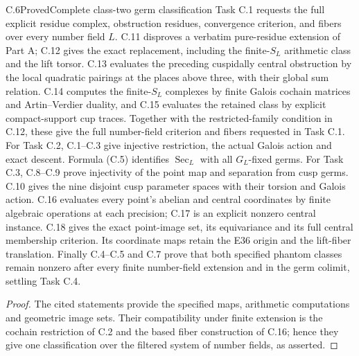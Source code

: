\begin{statement}{C.6}{Proved}{Complete class-two germ classification}
Task C.1 requests the full explicit residue complex,
obstruction residues, convergence criterion, and fibers
over every number field $L$.  C.11 disproves a
verbatim pure-residue extension of Part A; C.12
gives the exact replacement, including the
finite-$S_L$ arithmetic class and the lift torsor.
C.13 evaluates the preceding cuspidally central
obstruction by the local quadratic pairings at the
places above three, with their global sum relation.
C.14 computes the finite-$S_L$ complexes by finite Galois
cochain matrices and Artin--Verdier duality, and C.15
evaluates the retained class by explicit compact-support
cup traces.  Together with the restricted-family condition
in C.12, these give the full number-field criterion and
fibers requested in Task C.1.
For Task C.2, C.1--C.3 give injective restriction,
the actual Galois action and exact descent.  Formula
(C.5) identifies $\operatorname{Sec}_L$ with all
$G_L$-fixed germs.
For Task C.3, C.8--C.9 prove injectivity of the point
map and separation from cusp germs.  C.10 gives the
nine disjoint cusp parameter spaces with their torsion
and Galois action.  C.16 evaluates every point's
abelian and central coordinates by finite algebraic
operations at each precision; C.17 is an explicit
nonzero central instance.  C.18 gives the exact
point-image set, its equivariance and its full
central membership criterion.  Its coordinate
maps retain the E36 origin and the lift-fiber
translation.  Finally C.4--C.5 and C.7 prove
that both specified phantom classes remain
nonzero after every finite number-field
extension and in the germ colimit, settling
Task C.4.
\end{statement}
\begin{proof}
The cited statements provide the specified maps,
arithmetic computations and geometric image sets.
Their compatibility under finite extension is
the cochain restriction of C.2 and the based
fiber construction of C.16; hence they give
one classification over the filtered system
of number fields, as asserted.
\end{proof}

